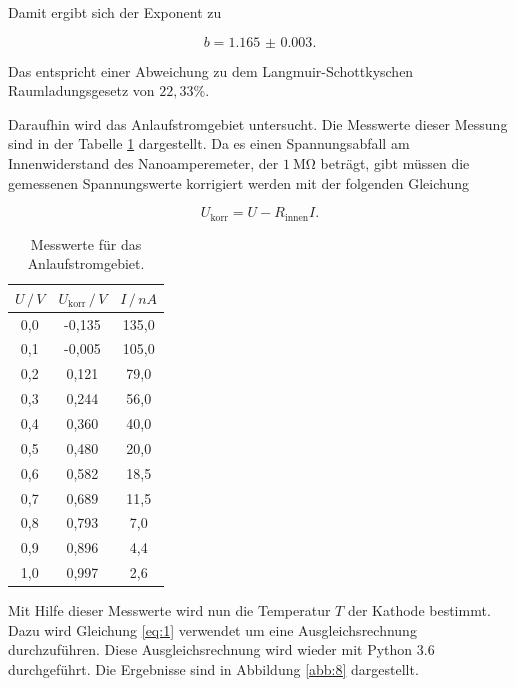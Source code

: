 Damit ergibt sich der Exponent zu

\begin{equation*}
  b = \num{1.165(3)}.
\end{equation*}

Das entspricht einer Abweichung zu dem Langmuir-Schottkyschen Raumladungsgesetz von $22,33 \%$.

Daraufhin wird das Anlaufstromgebiet untersucht. Die Messwerte dieser Messung sind
in der Tabelle \ref{tab:3} dargestellt. Da es einen Spannungsabfall am Innenwiderstand des
Nanoamperemeter, der $\SI{1}{\mega\ohm}$ beträgt, gibt müssen die gemessenen Spannungswerte
korrigiert werden mit der folgenden Gleichung

\begin{equation*}
  U_\text{korr} = U - R_\text{innen} I.
\end{equation*}

\begin{table}[H]
  \centering
  \caption{Messwerte für das Anlaufstromgebiet.}
  \label{tab:3}
  \begin{tabular}{c c c}
    \toprule
    $ U \, / \, V$ & $U_\text{korr} \, / \, V$ & $ I \, / \, nA$ \\
    \midrule
    0,0 & -0,135 & 135,0 \\
    0,1 & -0,005 & 105,0 \\
    0,2 &  0,121 &  79,0 \\
    0,3 &  0,244 &  56,0 \\
    0,4 &  0,360 &  40,0 \\
    0,5 &  0,480 &  20,0 \\
    0,6 &  0,582 &  18,5 \\
    0,7 &  0,689 &  11,5 \\
    0,8 &  0,793 &   7,0 \\
    0,9 &  0,896 &   4,4 \\
    1,0 &  0,997 &   2,6 \\
    \bottomrule
  \end{tabular}
\end{table}

Mit Hilfe dieser Messwerte wird nun die Temperatur $T$ der Kathode bestimmt.
Dazu wird Gleichung \ref{eq:1} verwendet um eine Ausgleichsrechnung durchzuführen.
Diese Ausgleichsrechnung wird wieder mit Python 3.6 durchgeführt. Die Ergebnisse sind
in Abbildung \ref{abb:8} dargestellt.


